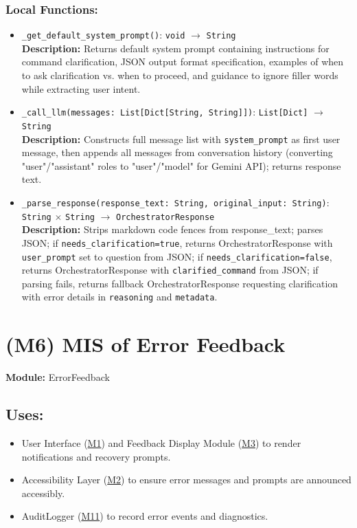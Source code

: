 \documentclass[12pt, titlepage]{article}
\begin{document}
\subsubsection{Local Functions:}
\begin{itemize}
  \item \texttt{\_get\_default\_system\_prompt()}: \texttt{void} $\rightarrow$ \texttt{String} \\
  \textbf{Description:} Returns default system prompt containing instructions for command clarification, JSON output format specification, examples of when to ask clarification vs. when to proceed, and guidance to ignore filler words while extracting user intent.

  \item \texttt{\_call\_llm(messages: List[Dict[String, String]])}: \texttt{List[Dict]} $\rightarrow$ \texttt{String} \\
  \textbf{Description:} Constructs full message list with \texttt{system\_prompt} as first user message, then appends all messages from conversation history (converting "user"/"assistant" roles to "user"/"model" for Gemini API); returns response text.

  \item \texttt{\_parse\_response(response\_text: String, original\_input: String)}: \texttt{String} $\times$ \texttt{String} $\rightarrow$ \texttt{OrchestratorResponse} \\
  \textbf{Description:} Strips markdown code fences from response\_text; parses JSON; if \texttt{needs\_clarification=true}, returns OrchestratorResponse with \texttt{user\_prompt} set to question from JSON; if \texttt{needs\_clarification=false}, returns OrchestratorResponse with \texttt{clarified\_command} from JSON; if parsing fails, returns fallback OrchestratorResponse requesting clarification with error details in \texttt{reasoning} and \texttt{metadata}.
\end{itemize}


\section{(M6) MIS of Error Feedback} 
\label{M6}
\textbf{Module:} ErrorFeedback

\subsection{Uses:}
\begin{itemize}
  \item User Interface (\hyperref[M1]{M1}) and Feedback Display Module (\hyperref[M3]{M3}) to render notifications and recovery prompts.
  \item Accessibility Layer (\hyperref[M2]{M2}) to ensure error messages and prompts are announced accessibly.
  \item AuditLogger (\hyperref[M11]{M11}) to record error events and diagnostics.
\end{itemize}
\end{document}
